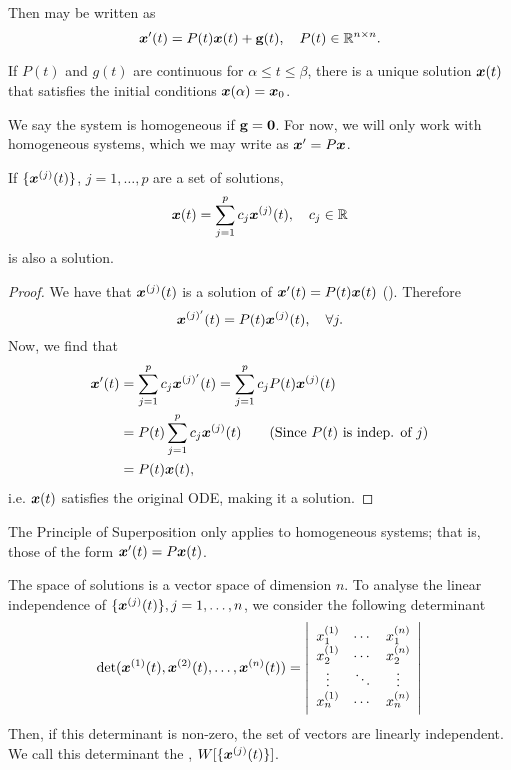 Then  may be written as
\begin{equation}\label{eq:linearsystemvector}
	\bm{x}'(t) = P(t) \bm{x}(t) + \textbf{g}(t), \quad P(t) \in \mathbb{R}^{n\times n}.
\end{equation}

\begin{theorem}
	If $P(t)$ and $g(t)$ are continuous for $\alpha \leq t \leq \beta$, there is a unique solution $\bm{x}(t)$ that satisfies the initial conditions $\bm{x}(\alpha) = \bm{x}_0$.
\end{theorem}

We say the system is homogeneous if $\textbf{g} = \bm{0}$. For now, we will only work with homogeneous systems, which we may write as $\bm{x}' = P\bm{x}$.

\begin{theorem}\label{thrm:superposition}
	If $\{\bm{x}^{(j)}(t)\}$, $j = 1, \ldots, p$ are a set of solutions,
	\begin{equation}\label{eq:gensol}
		\bm{x}(t) = \sum_{j=1}^p c_j \bm{x}^{(j)}(t), \quad c_j \in \mathbb{R}
	\end{equation}
	is also a solution.
\end{theorem}

\begin{proof}
	We have that $\bm{x}^{(j)}(t)$ is a solution of $\bm{x}'(t) = P(t) \bm{x}(t)$ (). Therefore
	\[
	\bm{x}^{(j)'}(t) = P(t) \bm{x}^{(j)}(t), \quad \forall j.
	\]
	Now, we find that
	\begin{align*}
		\bm{x}'(t) &= \sum_{j=1}^p c_j \bm{x}^{(j)'}(t)
		= \sum_{j=1}^p c_j P(t) \bm{x}^{(j)}(t) \\
		&= P(t) \sum_{j=1}^p c_j \bm{x}^{(j)}(t) \tag{Since $P(t)$ is indep. of $j$} \\
		&= P(t) \bm{x}(t),
	\end{align*}
	i.e. $\bm{x}(t)$ satisfies the original ODE, making it a solution.
\end{proof}

\begin{remark}
	The Principle of Superposition only applies to homogeneous systems; that is, those of the form $\bm{x}'(t) = P\bm{x}(t)$.
\end{remark}

The space of solutions is a vector space of dimension $n$. To analyse the linear independence of $\{\bm{x}^{(j)}(t)\}, j = 1, \ldots, n$, we consider the following determinant
\begin{equation}\label{eq:wronskian}
	\det(\bm{x}^{(1)}(t), \bm{x}^{(2)}(t), \ldots, \bm{x}^{(n)}(t)) = \left| \begin{array}{ccc} x_1^{(1)} & \cdots & x_1^{(n)} \\ x_2^{(1)} & \cdots & x_2^{(n)} \\ \vdots & \ddots & \vdots \\ x_n^{(1)} & \cdots & x_n^{(n)} \\
	\end{array} \right|
\end{equation}
Then, if this determinant is non-zero, the set of vectors are linearly independent. We call this determinant the , $W[\{\bm{x}^{(j)}(t)\}]$.

